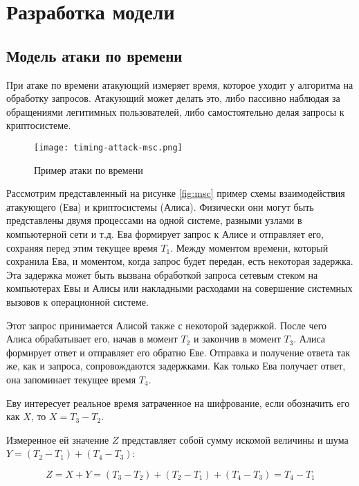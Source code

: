 \section{Разработка модели} \label{sec:timing}

\subsection{Модель атаки по времени}

При атаке по времени атакующий измеряет время, которое уходит у алгоритма на
обработку запросов. Атакующий может делать это, либо пассивно наблюдая за
обращениями легитимных пользователей, либо самостоятельно делая запросы к
криптосистеме.

\begin{figure}[h]
    \centering
    \texttt{[image: timing-attack-msc.png]}
    \caption{Пример атаки по времени}
\end{figure} \label{fig:msc}

Рассмотрим представленный на рисунке \ref{fig:msc} пример схемы взаимодействия
атакующего (Ева) и криптосистемы (Алиса). Физически они могут быть представлены
двумя процессами на одной системе, разными узлами в компьютерной сети и т.д.
Ева формирует запрос к Алисе и отправляет его, сохраняя перед этим текущее
время $T_1$. Между моментом времени, который сохранила Ева, и моментом, когда
запрос будет передан, есть некоторая задержка. Эта задержка может быть вызвана
обработкой запроса сетевым стеком на компьютерах Евы и Алисы или накладными
расходами на совершение системных вызовов к операционной системе.

Этот запрос принимается Алисой также с некоторой задержкой. После чего Алиса
обрабатывает его, начав в момент $T_2$ и закончив в момент $T_3$. Алиса
формирует ответ и отправляет его обратно Еве. Отправка и получение ответа так
же, как и запроса, сопровождаются задержками. Как только Ева получает ответ, она
запоминает текущее время $T_4$.

Еву интересует реальное время затраченное на шифрование, если обозначить его как
$X$, то $X = T_3 - T_2$.

Измеренное ей значение $Z$ представляет собой сумму искомой величины и шума
$Y = (T_2 - T_1) + (T_4 - T_3)$:

\begin{equation}
Z = X + Y = (T_3 - T_2) + (T_2 - T_1) + (T_4 - T_3) = T_4 - T_1
\end{equation} \label{eq:noise}

